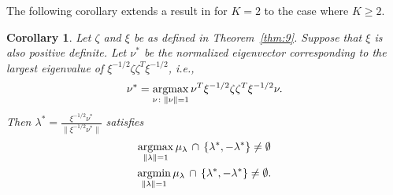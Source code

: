 \documentclass[10pt,draftclsnofoot,onecolumn]{IEEEtran}
\newtheorem{corollary}[theorem]{Corollary}
\theoremstyle{definition}
\newcommand{\argmax}{\operatornamewithlimits{argmax}}
\newcommand{\argmin}{\operatornamewithlimits{argmin}}
\begin{document}
The following corollary extends a result in
\cite{lee11} for $K = 2$ to the case
where $K \geq 2$. 
\begin{corollary}
  \label{cor:1}
  Let $\zeta$ and $\xi$ be as defined in Theorem~\ref{thm:9}. Suppose
  that $\xi$ is also positive definite. Let $\nu^{*}$ be the
  normalized eigenvector corresponding to the largest eigenvalue of $ \xi^{-1/2}
  \zeta \zeta^{T} \xi^{-1/2}$, i.e.,
 \begin{equation}
   \label{eq:9}
  \nu^{*} = \argmax_{\nu \colon \| \nu \| = 1}
  \nu^{T} \xi^{-1/2} \zeta \zeta^{T} \xi^{-1/2}
  \nu.
 \end{equation}
 Then $\lambda^{*} = \tfrac{\xi^{-1/2} \nu^{*}}{\|\xi^{-1/2} \nu^{*} \|}$ satisfies
 \begin{gather}
   \label{eq:8}
 \argmax_{ \|\lambda\| = 1}
 \mu_{\lambda} \, \cap \, \{\lambda^{*}, - \lambda^{*}\} \not = \emptyset \\
 \argmin_{ \| \lambda \| = 1} \mu_{\lambda} \, \cap \, \{\lambda^{*}, -
 \lambda^{*}\} \not = \emptyset.
 \end{gather}
\end{corollary}
\end{document}

